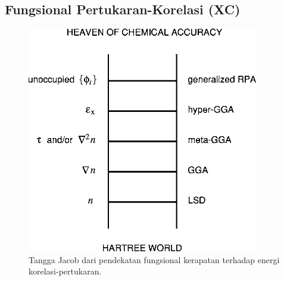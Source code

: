 \subsection{Fungsional Pertukaran-Korelasi (XC)}

\begin{figure}[h!]
    \centering
    \includegraphics[width=0.9\textwidth]{gambar/jacob_ladder}
    \caption{Tangga Jacob dari pendekatan fungsional kerapatan terhadap energi korelasi-pertukaran. \cite{perdew2005}}
    \label{fig:xc_jacob_ladder}
\end{figure}


